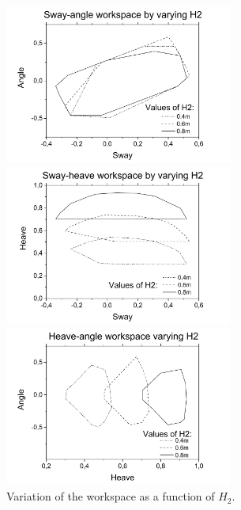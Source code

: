 \documentclass[10.5pt, twocolumn]{article}
\begin{document}
\begin{figure}
\centering
\begin{minipage}{0.49\textwidth}
	\includegraphics[width=7.5cm]{Images/ws_h2_xa}
\end{minipage}
\begin{minipage}{0.49\textwidth}
	\includegraphics[width=7.5cm]{Images/ws_h2_xy}
\end{minipage}
\begin{minipage}{0.49\textwidth}
	\includegraphics[width=7.5cm]{Images/ws_h2_ya}
\end{minipage}
    \caption{Variation of the workspace as a function of \( H_2 \).}
    \label{fig:ws_2}
\end{figure}
\end{document}
